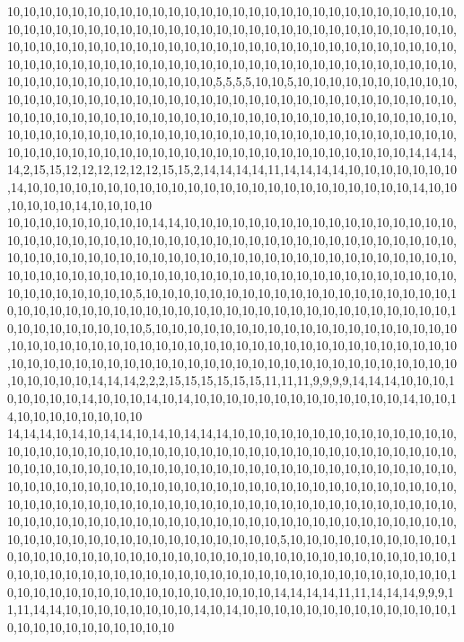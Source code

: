 10,10,10,10,10,10,10,10,10,10,10,10,10,10,10,10,10,10,10,10,10,10,10,10,10,10,10,10,10,10,10,10,10,10,10,10,10,10,10,10,10,10,10,10,10,10,10,10,10,10,10,10,10,10,10,10,10,10,10,10,10,10,10,10,10,10,10,10,10,10,10,10,10,10,10,10,10,10,10,10,10,10,10,10,10,10,10,10,10,10,10,10,10,10,10,10,10,10,10,10,10,10,10,10,10,10,10,10,10,10,10,10,10,10,10,10,10,10,10,10,10,10,10,10,10,5,5,5,5,10,10,5,10,10,10,10,10,10,10,10,10,10,10,10,10,10,10,10,10,10,10,10,10,10,10,10,10,10,10,10,10,10,10,10,10,10,10,10,10,10,10,10,10,10,10,10,10,10,10,10,10,10,10,10,10,10,10,10,10,10,10,10,10,10,10,10,10,10,10,10,10,10,10,10,10,10,10,10,10,10,10,10,10,10,10,10,10,10,10,10,10,10,10,10,10,10,10,10,10,10,10,10,10,10,10,10,10,10,10,10,10,10,10,10,10,10,10,10,10,10,10,14,14,14,14,2,15,15,12,12,12,12,12,12,15,15,2,14,14,14,14,11,14,14,14,14,10,10,10,10,10,10,10,14,10,10,10,10,10,10,10,10,10,10,10,10,10,10,10,10,10,10,10,10,10,10,10,10,14,10,10,10,10,10,10,14,10,10,10,10
10,10,10,10,10,10,10,10,10,14,14,10,10,10,10,10,10,10,10,10,10,10,10,10,10,10,10,10,10,10,10,10,10,10,10,10,10,10,10,10,10,10,10,10,10,10,10,10,10,10,10,10,10,10,10,10,10,10,10,10,10,10,10,10,10,10,10,10,10,10,10,10,10,10,10,10,10,10,10,10,10,10,10,10,10,10,10,10,10,10,10,10,10,10,10,10,10,10,10,10,10,10,10,10,10,10,10,10,10,10,10,10,10,10,10,10,10,10,10,10,5,10,10,10,10,10,10,10,10,10,10,10,10,10,10,10,10,10,10,10,10,10,10,10,10,10,10,10,10,10,10,10,10,10,10,10,10,10,10,10,10,10,10,10,10,10,10,10,10,10,10,10,10,10,10,10,10,5,10,10,10,10,10,10,10,10,10,10,10,10,10,10,10,10,10,10,10,10,10,10,10,10,10,10,10,10,10,10,10,10,10,10,10,10,10,10,10,10,10,10,10,10,10,10,10,10,10,10,10,10,10,10,10,10,10,10,10,10,10,10,10,10,10,10,10,10,10,10,10,10,10,10,10,10,10,10,10,10,14,14,14,2,2,2,15,15,15,15,15,15,11,11,11,9,9,9,9,14,14,14,10,10,10,10,10,10,10,10,14,10,10,10,14,10,14,10,10,10,10,10,10,10,10,10,10,10,10,10,14,10,10,14,10,10,10,10,10,10,10,10
14,14,14,10,14,10,14,14,10,14,10,14,14,14,10,10,10,10,10,10,10,10,10,10,10,10,10,10,10,10,10,10,10,10,10,10,10,10,10,10,10,10,10,10,10,10,10,10,10,10,10,10,10,10,10,10,10,10,10,10,10,10,10,10,10,10,10,10,10,10,10,10,10,10,10,10,10,10,10,10,10,10,10,10,10,10,10,10,10,10,10,10,10,10,10,10,10,10,10,10,10,10,10,10,10,10,10,10,10,10,10,10,10,10,10,10,10,10,10,10,10,10,10,10,10,10,10,10,10,10,10,10,10,10,10,10,10,10,10,10,10,10,10,10,10,10,10,10,10,10,10,10,10,10,10,10,10,10,10,10,10,10,10,10,10,10,10,10,10,10,10,10,10,10,10,10,10,10,10,10,10,10,10,10,10,5,10,10,10,10,10,10,10,10,10,10,10,10,10,10,10,10,10,10,10,10,10,10,10,10,10,10,10,10,10,10,10,10,10,10,10,10,10,10,10,10,10,10,10,10,10,10,10,10,10,10,10,10,10,10,10,10,10,10,10,10,10,10,10,10,10,10,10,10,10,10,10,10,10,10,10,10,10,10,10,10,10,10,10,14,14,14,14,11,11,14,14,14,9,9,9,11,11,14,14,10,10,10,10,10,10,10,10,14,10,14,10,10,10,10,10,10,10,10,10,10,10,10,10,10,10,10,10,10,10,10,10,10,10,10
